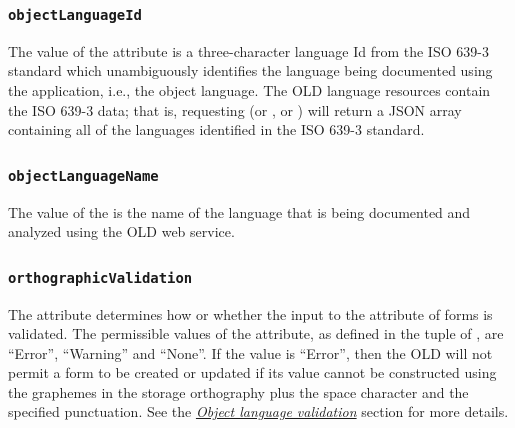 \documentclass[letterpaper,10pt,english]{sphinxmanual}
\begin{document}
\subsubsection{\texttt{objectLanguageId}}
\label{datastructure:objectlanguageid}
The value of the  attribute is a three-character language Id
from the ISO 639-3 standard which unambiguously identifies the language being
documented using the application, i.e., the object language.  The OLD language
resources contain the ISO 639-3 data; that is, requesting 
(or ,  or
) will return a JSON array containing all of
the languages identified in the ISO 639-3 standard.


\subsubsection{\texttt{objectLanguageName}}
\label{datastructure:objectlanguagename}
The value of the  is the name of the language that is
being documented and analyzed using the OLD web service.


\subsubsection{\texttt{orthographicValidation}}
\label{datastructure:orthographicvalidation}
The  attribute determines how or whether the input
to the  attribute of forms is validated.  The permissible
values of the  attribute, as defined in the
 tuple of , are ``Error'', ``Warning'' and
``None''.  If the value is ``Error'', then the OLD will not permit a form to be
created or updated if its  value cannot be constructed using
the graphemes in the storage orthography plus the space character and the
specified punctuation.  See the {\hyperref[interface:object-language-validation]{\emph{Object language validation}}} section for
more details.
\end{document}
